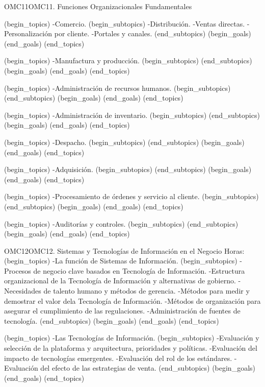 \begin{BKL2}{OMC11}{OMC11. Funciones Organizacionales Fundamentales}
 
(begin_topics)
-Comercio.
(begin_subtopics)
-Distribución.
-Ventas directas.
-Personalización por cliente.
-Portales y canales.
(end_subtopics)
(begin_goals)
(end_goals)
(end_topics)

 

(begin_topics)
-Manufactura y producción.
(begin_subtopics)
(end_subtopics)
(begin_goals)
(end_goals)
(end_topics)

 
(begin_topics)
-Administración de recursos humanos.
(begin_subtopics)
(end_subtopics)
(begin_goals)
(end_goals)
(end_topics)

 

(begin_topics)
-Administración de inventario.
(begin_subtopics)
(end_subtopics)
(begin_goals)
(end_goals)
(end_topics)

 

(begin_topics)
-Despacho.
(begin_subtopics)
(end_subtopics)
(begin_goals)
(end_goals)
(end_topics)

 

(begin_topics)
-Adquisición.
(begin_subtopics)
(end_subtopics)
(begin_goals)
(end_goals)
(end_topics)

 
(begin_topics)
-Procesamiento de órdenes y servicio al cliente.
(begin_subtopics)
(end_subtopics)
(begin_goals)
(end_goals)
(end_topics)

 

(begin_topics)
-Auditorías y controles.
(begin_subtopics)
(end_subtopics)
(begin_goals)
(end_goals)
(end_topics)

\end{BKL2}



\begin{BKL2}{OMC12}{OMC12. Sistemas y Tecnologías de Información en el Negocio}
Horas:
(begin_topics)
-La función de Sistemas de Información.
(begin_subtopics)
-Procesos de negocio clave basados en Tecnología de Información.
-Estructura organizacional de la Tecnología de Información y alternativas de gobierno.
-Necesidades de talento humano y métodos de gerencia.
-Métodos para medir y demostrar el valor dela Tecnología de Información.
-Métodos de organización para asegurar el cumplimiento de las regulaciones.
-Administración de fuentes de tecnología.
(end_subtopics)
(begin_goals)
(end_goals)
(end_topics)

(begin_topics)
-Las Tecnologías de Información.
(begin_subtopics)
-Evaluación y selección de la plataforma y arquitectura, prioridades y políticas.
-Evaluación del impacto de tecnologías emergentes.
-Evaluación del rol de los estándares.
-Evaluación del efecto de las estrategias de venta.
(end_subtopics)
(begin_goals)
(end_goals)
(end_topics)

\end{BKL2}

